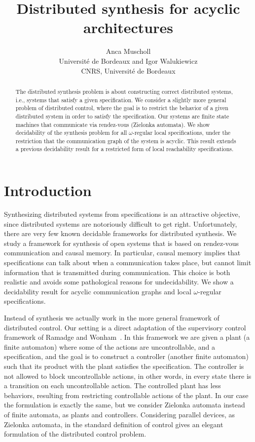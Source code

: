 \documentclass[10pt,a4paper]{article}
\title{Distributed synthesis for acyclic architectures}
\author{Anca Muscholl\\ Universit\'e de Bordeaux and Igor Walukiewicz\\CNRS, Universit\'e de Bordeaux}
\newcommand{\igw}[1]{}
\begin{document}
\maketitle

\begin{abstract}
  The distributed synthesis problem is about constructing correct
  distributed systems, i.e., systems that satisfy a given
  specification. We consider  a slightly more general problem of
  distributed control, where the goal is to restrict the behavior
  of a given distributed system in order to satisfy the
  specification. Our systems are finite state machines that
  communicate via rendez-vous (Zielonka automata). We show
  decidability of the synthesis problem for all $\omega$-regular local
  specifications, under the restriction that the communication graph
  of the system is acyclic. This result extends a previous
  decidability result for a restricted form of local reachability 
  specifications.

\end{abstract}



\section{Introduction}

\igw{update Intro}
Synthesizing distributed systems from specifications is an attractive
objective, since distributed systems are notoriously difficult to get
right. Unfortunately, there are very few known decidable frameworks
for distributed synthesis. We study a framework for synthesis
of open systems that is based on rendez-vous communication and causal
memory. In particular, causal memory implies that specifications can talk about
when a communication takes place, but cannot limit information that is
transmitted during communication. This choice is both realistic and
avoids some pathological reasons for undecidability. We show
a decidability result for acyclic communication graphs and local
$\omega$-regular specifications.


Instead of synthesis we actually work in the more general framework of
distributed control. Our setting is a direct adaptation of the
supervisory control framework of Ramadge and Wonham~\cite{RW89}. In
this framework we are given a plant (a finite automaton) where some of
the actions are uncontrollable, and a specification, and the goal is to
construct a controller (another finite automaton) such that its
product with the plant satisfies the specification. The controller is
not allowed to block uncontrollable actions, in other words, in every state there is a
transition on each uncontrollable action. The controlled plant has
less behaviors, resulting from restricting
controllable actions of the plant.  In our case the formulation is
exactly the same, but we consider Zielonka automata instead of finite
automata, as plants and controllers. Considering parallel devices, as
Zielonka automata, in the standard definition of control gives an
elegant formulation of the distributed control problem.
\end{document}
